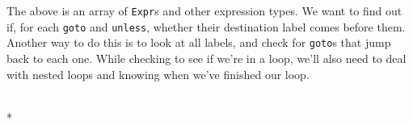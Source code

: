 \documentclass[letterpaper,10pt,english]{/Users/danluu/anaconda/lib/python2.7/site-packages/sphinx/texinputs/sphinxhowto}
\def\smaller{\fontsize{9.5pt}{9.5pt}\selectfont}
\begin{document}
        
    
The above is an array of \texttt{Expr}s and other expression types. We
want to find out if, for each \texttt{goto} and \texttt{unless}, whether
their destination label comes before them. Another way to do this is to
look at all labels, and check for \texttt{goto}s that jump back to each
one. While checking to see if we're in a loop, we'll also need to deal
with nested loops and knowing when we've finished our loop.


    
        \vspace{6pt}
        \makebox[0.1\linewidth]{\smaller\hfill\tt\color{nbframe-in-prompt}In\hspace{4pt}{[}44{]}:\hspace{4pt}}\\*
        \vspace{-2.65\baselineskip}
\end{document}
